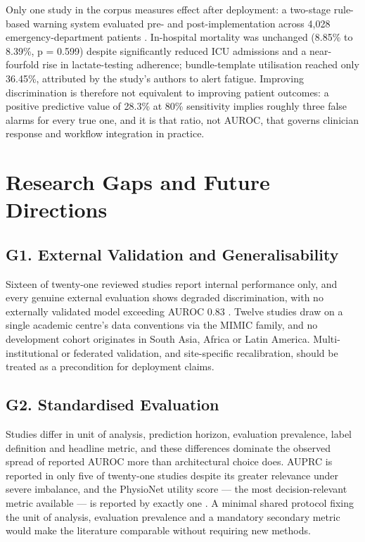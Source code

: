 \documentclass[conference]{IEEEtran}
\begin{document}
Only one study in the corpus measures effect after deployment: a two-stage rule-based warning system evaluated pre- and post-implementation across 4,028 emergency-department patients \cite{r28}. In-hospital mortality was unchanged (8.85\% to 8.39\%, p = 0.599) despite significantly reduced ICU admissions and a near-fourfold rise in lactate-testing adherence; bundle-template utilisation reached only 36.45\%, attributed by the study's authors to alert fatigue. Improving discrimination is therefore not equivalent to improving patient outcomes: a positive predictive value of 28.3\% at 80\% sensitivity \cite{r18} implies roughly three false alarms for every true one, and it is that ratio, not AUROC, that governs clinician response and workflow integration in practice.

\section{Research Gaps and Future Directions}

\subsection*{G1. External Validation and Generalisability}

Sixteen of twenty-one reviewed studies report internal performance only, and every genuine external evaluation shows degraded discrimination, with no externally validated model exceeding AUROC 0.83 \cite{r17,r18,r19,r21,r23}. Twelve studies draw on a single academic centre's data conventions via the MIMIC family, and no development cohort originates in South Asia, Africa or Latin America. Multi-institutional or federated validation, and site-specific recalibration, should be treated as a precondition for deployment claims.

\subsection*{G2. Standardised Evaluation}

Studies differ in unit of analysis, prediction horizon, evaluation prevalence, label definition and headline metric, and these differences dominate the observed spread of reported AUROC more than architectural choice does. AUPRC is reported in only five of twenty-one studies despite its greater relevance under severe imbalance, and the PhysioNet utility score --- the most decision-relevant metric available --- is reported by exactly one \cite{r31}. A minimal shared protocol fixing the unit of analysis, evaluation prevalence and a mandatory secondary metric would make the literature comparable without requiring new methods.
\end{document}
